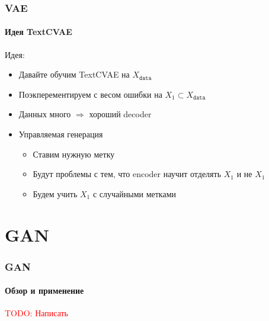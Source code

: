 \documentclass[10pt]{beamer}
\newcommand\TODO[1]{\textcolor{red}{{\Large TODO: #1}}}
\newcommand{\X}[1]{X_{\texttt{#1}}}
\newcommand{\Xdata}{\X{data}}
\begin{document}
\begin{frame}
\frametitle{VAE}
\framesubtitle{Идея TextCVAE}

Идея:
\begin{itemize}
    \item Давайте обучим TextCVAE на $\Xdata$
    \item Поэкперементируем с весом ошибки на $X_1 \subset \Xdata$
    \item Данных много $\Rightarrow$ хороший decoder
    \item Управляемая генерация
    \begin{itemize}
        \item Ставим нужную метку
        \item Будут проблемы с тем, что encoder научит отделять $X_1$ и не $X_1$
        \item Будем учить $X_1$ с случайными метками
    \end{itemize}
\end{itemize}

\end{frame}
\section{GAN}
\begin{frame}
\frametitle{GAN}
\framesubtitle{Обзор и применение}

\TODO{Написать}

\end{frame}
\end{document}
